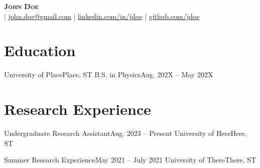 \documentclass[letterpaper,11pt]{article}
\begin{document}

\begin{center}
    \textbf{\Huge \scshape John Doe} \\ \vspace{2pt}
    \small {} \hspace{2pt}$|$ \href{mailto:john.doe@gmail.com}{john.doe@gmail.com} $|$ 
    \href{https://linkedin.com/in/...}{linkedin.com/in/jdoe} $|$
    \href{https://github.com/...}{github.com/jdoe}
\end{center}



\section{Education}
    \cvSubHeadingListStart
        \cvSubheading
        {University of Place}{Place, ST}
        {B.S. in Physics}{Aug. 202X -- May 202X}
    \cvSubHeadingListEnd



\section{Research Experience}
    \cvSubHeadingListStart
        \cvSubheading
            {Undergraduate Research Assistant}{Aug. 2023 -- Present}
            {University of Here}{Here, ST}
            \cvItemListStart
            \cvItemListEnd

        \cvSubheading
            {Summer Research Experience}{May 2021 -- July 2021}
            {University of There}{There, ST}
            \cvItemListStart
        \cvItemListEnd

    \cvSubHeadingListEnd
\end{document}
